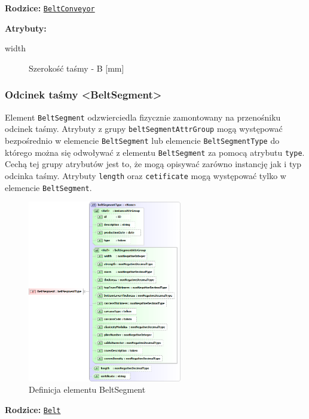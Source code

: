 \documentclass[12pt,a4paper]{article}
\begin{document}
\noindent\textbf{Rodzice:} \texttt{\hyperref[sec:BeltConveyor]{BeltConveyor}}

\noindent\textbf{Atrybuty:}
\begin{description}
\item[width] Szerokość taśmy - B [mm]
\end{description}


\subsubsection{Odcinek taśmy <BeltSegment>}
Element {\tt BeltSegment} odzwierciedla fizycznie zamontowany na przenośniku
odcinek taśmy.  Atrybuty z grupy {\tt beltSegmentAttrGroup} mogą występować
bezpośrednio w elemencie {\tt BeltSegment} lub elemencie {\tt BeltSegmentType}
do którego można się odwoływać z elementu {\tt BeltSegment} za pomocą atrybutu
{\tt type}.  Cechą tej grupy atrybutów jest to, że mogą opisywać zarówno
instancję jak i typ odcinka taśmy. Atrybuty {\tt length} oraz {\tt cetificate}
mogą występować tylko w elemencie {\tt BeltSegment}.

\begin{figure}[H]
  \centering
  \includegraphics[width=0.6\textwidth]{png/belt_segment_xsd2}
  \caption{Definicja elementu BeltSegment}
  \label{fig:beltSegment-xsd}
\end{figure}

\noindent\textbf{Rodzice:} \texttt{\hyperref[sec:Belt]{Belt}}
\end{document}
